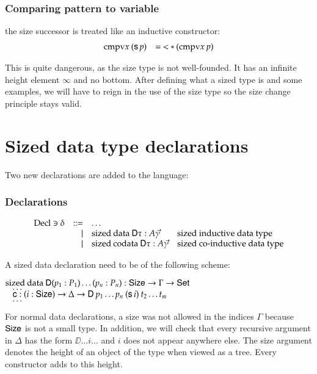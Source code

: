 \subsubsection{Comparing pattern to variable}
the size successor is treated like an inductive constructor:
\[
\begin{array}[t]{ll}
\mathrm{cmpv} x \: (\mathsf{s}\, p) & = \: < * \: (\mathrm{cmpv} x \: p)\\
\end{array}
\]

This is quite dangerous, as the size type is not well-founded.
It has an infinite height element $\infty$ and no bottom. 
After defining what a sized type is and some examples, we will have to reign in the use of the size type
so the size change principle stays valid.


\section{Sized data type declarations}

\newcommand{\sizecon}[4]{#1\vdash#2\mbox{ \textbf{sizeCon} }#3\:#4}
\newcommand{\sizeuse}[4]{#1\vdash#2\mbox{ \textbf{sizeUse} }#3\:#4}


Two new declarations are added to the language:
\subsubsection{Declarations}
\[
\begin{array}{lrll}
\mathrm{Decl} \ni \delta & ::= & \ldots & \\
& \mid & \mathrm{sized}\: \mathrm{data}\: \mathsf{D} \tau : A \vec{\gamma} & \mbox{sized inductive data type}\\ 
& \mid & \mathrm{sized}\: \mathrm{codata}\: \mathsf{D} \tau : A \vec{\gamma} & \mbox{sized co-inductive data type} \\
\end{array}
\]

A sized data declaration need to be of the following scheme:
\begin{bsp}
$\mathrm{sized}\: \mathrm{data}\: \mathsf{D} ( p_1 : P_1) \ldots ( p_n : P_n) : \mathsf{Size} \rightarrow \Gamma \rightarrow \mathsf{Set} $\\
$\hspace*{3mm} \ldots$\\
$\hspace*{3mm} \mathsf{c} : (i : \mathsf{Size}) \rightarrow \Delta \rightarrow \mathsf{D} \: p_1 \ldots p_n \: (\mathsf{s}\, i) \: t_2 \ldots t_m$\\
$\hspace*{3mm} \ldots$\\   
\end{bsp}
For normal data declarations, a size was not allowed in the indices $\Gamma$ because $\mathsf{Size}$ is not a small type.
In addition, we will check that every recursive argument in $\Delta$ has the form $\DD \ldots i \ldots $ and $i$ does not appear anywhere else. The size argument denotes the height of an object of the type when viewed as a tree. Every constructor adds to this height.


